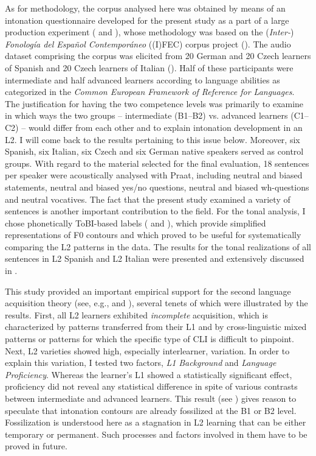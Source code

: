 As for methodology, the corpus analysed here was obtained by means of an intonation questionnaire developed for the present study as a part of a large production experiment ( and ), whose methodology was based on the (\textit{Inter-}) \textit{Fonología del Español Contemporáneo} ((I)FEC) corpus project (\citealt{PustkaEtAl2016,PustkaEtAl2018}). The audio dataset comprising the corpus was elicited from 20 German and 20 Czech learners of Spanish and 20 Czech learners of Italian (). Half of these participants were intermediate and half advanced learners according to language abilities as categorized in the \textit{Common European Framework of Reference for Languages}. The justification for having the two competence levels was primarily to examine in which ways the two groups -- intermediate (B1--B2) vs. advanced learners (C1--C2) -- would differ from each other and to explain intonation development in an L2. I will come back to the results pertaining to this issue below. Moreover, six Spanish, six Italian, six Czech and six German native speakers served as control groups. With regard to the material selected for the final evaluation, 18 sentences per speaker were acoustically analysed with Praat, including neutral and biased statements, neutral and biased yes/no questions, neutral and biased wh-questions and neutral vocatives. The fact that the present study examined a variety of sentences is another important contribution to the field. For the tonal analysis, I chose phonetically ToBI-based labels ( and ), which provide simplified representations of F0 contours and which proved to be useful for systematically comparing the L2 patterns in the data. The results for the tonal realizations of all sentences in L2 Spanish and L2 Italian were presented and extensively discussed in .



This study provided an important empirical support for the second language acquisition theory (see, e.g., \citealt{TowellHawkins1994} and ), several tenets of which were illustrated by the results. First, all L2 learners exhibited \textit{incomplete} acquisition, which is characterized by patterns transferred from their L1 and by cross-linguistic mixed patterns or patterns for which the specific type of CLI is difficult to pinpoint. Next, L2 varieties showed high, especially interlearner, variation. In order to explain this variation, I tested two factors, \textit{L1} \textit{Background} and \textit{Language Proficiency}. Whereas the learner’s L1 showed a statistically significant effect, proficiency did not reveal any statistical difference in spite of various contrasts between intermediate and advanced learners. This result (see ) gives reason to speculate that intonation contours are already fossilized at the B1 or B2 level. Fossilization is understood here as a stagnation in L2 learning that can be either temporary or permanent. Such processes and factors involved in them have to be proved in future.



